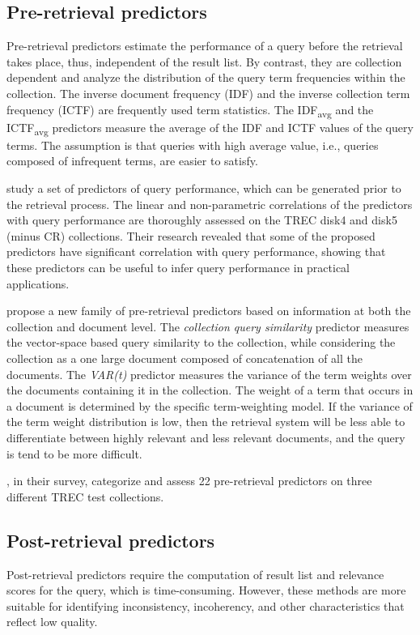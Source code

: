\subsection{Pre-retrieval predictors} 
Pre-retrieval predictors estimate the performance of a query before the retrieval takes place, thus, independent of the result list.
By contrast, they are collection dependent and analyze the distribution of the query term frequencies within the collection.
The inverse document frequency (IDF) and the inverse collection term frequency (ICTF) are frequently used term statistics.
The IDF\textsubscript{avg} and the ICTF\textsubscript{avg} predictors measure the average of the IDF and ICTF values of the query terms.
The assumption is that queries with high average value, i.e., queries composed of infrequent terms, are easier to satisfy. 

\citet*{InferringQP} study a set of predictors of query performance, which can be generated prior to the retrieval process.
The linear and non-parametric correlations of the predictors with query performance are thoroughly assessed on the TREC disk4 and disk5 (minus CR) collections.
Their research revealed that  some of the proposed predictors have significant correlation with query performance, showing that these predictors can be useful to infer query performance in practical applications.

\citet*{preVar} propose a new family of pre-retrieval predictors based on information at both the collection and document level.
The \emph{collection query similarity} predictor measures the vector-space based query similarity to the collection, while considering the collection as a one large document composed of concatenation of all the documents. The \emph{VAR(t)} predictor measures the variance of the term weights over the documents containing it in the collection. 
The weight of a term that occurs in a document is determined by the specific term-weighting model. 
If the variance of the term weight distribution is low, then the retrieval system will be less able to differentiate between highly relevant and less relevant documents, and the query is tend to be more difficult. 

\citet*{preSurvey}, in their survey, categorize and assess 22 pre-retrieval predictors on three different TREC test collections.

\subsection{Post-retrieval predictors}
Post-retrieval predictors require the computation of result list and relevance scores for the query, which is time-consuming. 
However, these methods are more suitable for identifying inconsistency, incoherency, and other characteristics that reflect low quality. 

